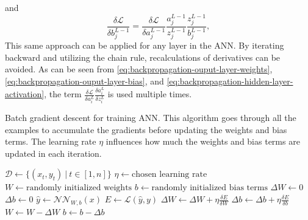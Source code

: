 and
\begin{equation*}
    \frac{\delta \mathcal{L}}{\delta b_j^{L-1}} = \frac{\delta \mathcal{L}}{\delta a_j^{L-1}} \frac{a_j^{L-1}}{z_j^{L-1}} \frac{z_j^{L-1}}{b_j^{L-1}},
\end{equation*}
This same approach can be applied for any layer in the \gls{ANN}.
By iterating backward and utilizing the chain rule, recalculations of derivatives can be avoided.
As can be seen from \autoref{eq:backpropagation-ouput-layer-weights}, \autoref{eq:backpropagation-ouput-layer-bias}, and \autoref{eq:backpropagation-hidden-layer-activation}, the term $\frac{\delta\mathcal{L}}{\delta a_i^L} \frac{\delta a_i^L}{\delta z_i^L}$ is used multiple times.

\begin{algorithm}
    \caption{Batch gradient descent for training \gls{ANN}. This algorithm goes through all the examples to accumulate the gradients before updating the weights and bias terms. The learning rate $\eta$ influences how much the weights and bias terms are updated in each iteration.}
    \label{alg:ann-training}
    \begin{algorithmic}
        \State $\mathcal{D} \gets \{(x_t, y_t)\ |\ t \in [1, n]\}$
        \State $\eta \gets \text{chosen learning rate}$
        \State $W \gets \text{randomly initialized weights}$
        \State $b \gets \text{randomly initialized bias terms}$
            \State $\Delta W \gets 0$
            \State $\Delta b \gets 0$
                \State $\hat{y} \gets \mathcal{NN}_{W, b}(x)$
                \State $E \gets \mathcal{L}(\hat{y}, y)$
                \State $\Delta W \gets \Delta W + \eta \frac{\delta E}{\delta W}$
                \State $\Delta b \gets \Delta b + \eta \frac{\delta E}{\delta b}$
            \EndFor
            \State $W \gets W - \Delta W$
            \State $b \gets b - \Delta b$
        \EndWhile
    \end{algorithmic}
\end{algorithm}
